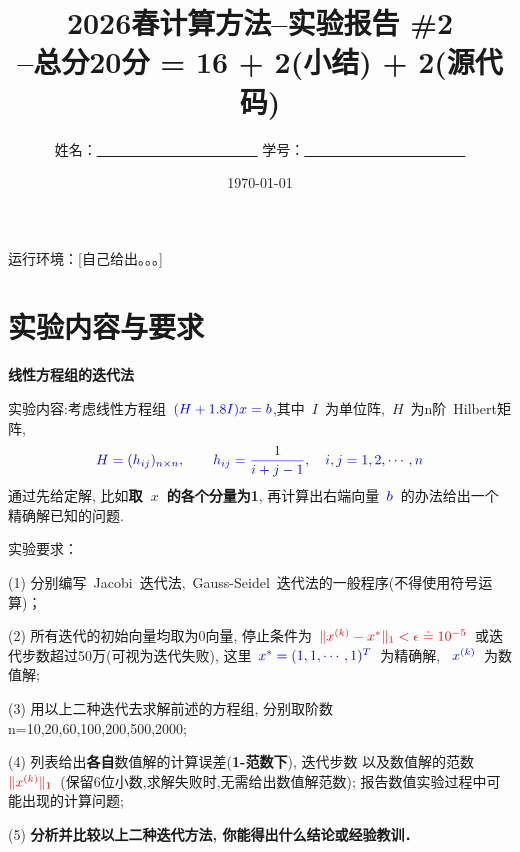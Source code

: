 \documentclass[UTF8]{ctexart}
\title{\bf 2026春计算方法--实验报告 \#2 \\
--总分20分 = 16 + 2(小结) + 2(源代码)}
\author{姓名：\underline{~~~~~~~~~~~~~~~~~~~~~~~}  学号：\underline{~~~~~~~~~~~~~~~~~~~~~~~} }
\date{\today}
\begin{document}
\maketitle

运行环境：[自己给出。。。]

\section{实验内容与要求}
\bf
{线性方程组的迭代法}



{\color{blue} 实验内容}:考虑线性方程组~$\color{blue}{(H + 1.8 I )x = b}$,其中~$I$~为单位阵,~$H$~为n阶~{\color{blue}Hilbert矩阵},%
$$\color{blue}{ H=(h_{ij})_{n\times n}, \qquad  h_{ij}=\frac{1}{i+j-1},\quad i,j=1,2,\cdots,n  }$$
通过先给{\color{blue}定解}, 比如{\color{red}\bf 取~$x$~的各个分量为1}, 再计算出右端向量~$\color{blue}b$~的办法给出一个精确解已知的问题.

{\color{blue} 实验要求}：

(1) 分别编写~Jacobi~迭代法,~Gauss-Seidel~迭代法的一般程序({\color{red}不得使用符号运算})；

(2) 所有迭代的{\color{blue}初始向量均取为0向量, 停止条件为~$\color{red}\|x^{(k)}  - x^{*} \|_1 < \epsilon \doteq  10^{-5}$~或迭代步数超过50万(可视为迭代失败)},
这里~$\color{blue}x^{*}=(1,1,\cdots,1)^T$~为精确解, ~$\color{blue} x^{(k)}$~为数值解;

(3) 用以上二种迭代去求解前述的方程组,
分别取阶数~{\color{red} n=10,20,60,100,200,500,2000};

(4) 列表给出{\bf 各自}{\color{blue}数值解}的计算误差({\bf\color{red}1-范数下}), {\color{blue}迭代步数} 
以及{\color{blue}数值解}的范数~$\color{red}\|x^{(k)} \|_1$~(保留6位小数,求解失败时,无需给出数值解范数);
    报告数值实验过程中可能出现的计算问题;

%
(5) {\bf 分析并比较以上二种迭代方法, 你能得出什么结论或经验教训．}
\clearpage
\end{document}
